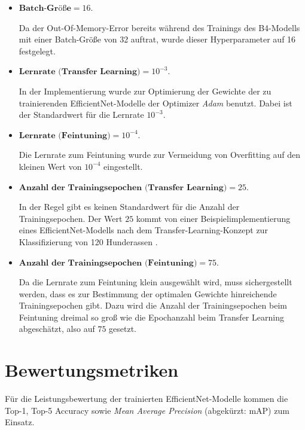 \begin{itemize}
	\item $\textbf{Batch-Größe} = 16$. 
	
	Da der Out-Of-Memory-Error bereits während des Trainings des B4-Modells mit einer Batch-Größe von 32 auftrat, wurde dieser Hyperparameter auf 16 festgelegt.
	
	\item $\textbf{Lernrate (Transfer Learning)} = 10^{-3}$. 
	
	In der Implementierung wurde zur Optimierung der Gewichte der zu trainierenden EfficientNet-Modelle der Optimizer \emph{Adam} benutzt. Dabei ist der Standardwert für die Lernrate $10^{-3}$.
	
	\item $\textbf{Lernrate (Feintuning)} = 10^{-4}$. 
	
	Die Lernrate zum Feintuning wurde zur Vermeidung von Overfitting auf den kleinen Wert von $10^{-4}$ eingestellt.
	
	\item $\textbf{Anzahl der Trainingsepochen (Transfer Learning)} = 25$. 
	
	In der Regel gibt es keinen Standardwert für die Anzahl der Trainingsepochen. Der Wert $25$ kommt von einer Beispielimplementierung eines EfficientNet-Modells nach dem Transfer-Learning-Konzept zur Klassifizierung von 120 Hunderassen .
	
	\item $\textbf{Anzahl der Trainingsepochen (Feintuning)} = 75$. 
	
	Da die Lernrate zum Feintuning klein ausgewählt wird, muss sichergestellt werden, dass es zur Bestimmung der optimalen Gewichte hinreichende Trainingsepochen gibt. Dazu wird die Anzahl der Trainingsepochen beim Feintuning dreimal so groß wie die Epochanzahl beim Transfer Learning abgeschätzt, also auf $75$ gesetzt.
\end{itemize}

\section{Bewertungsmetriken} \label{sec:evalmetrics}

Für die Leistungsbewertung der trainierten EfficientNet-Modelle kommen die Top-1, Top-5 Accuracy sowie \emph{Mean Average Precision} (abgekürzt: mAP) zum Einsatz.


